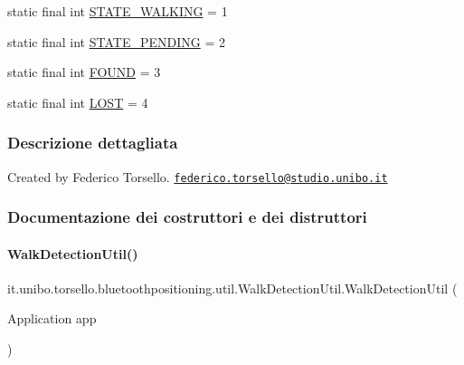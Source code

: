 \begin{DoxyCompactItemize}
\item 
static final int \hyperlink{classit_1_1unibo_1_1torsello_1_1bluetoothpositioning_1_1util_1_1WalkDetectionUtil_a7b7a1934c81b55c20ece9ba2d0bee4c8_a7b7a1934c81b55c20ece9ba2d0bee4c8}{S\+T\+A\+T\+E\+\_\+\+W\+A\+L\+K\+I\+NG} = 1
\item 
static final int \hyperlink{classit_1_1unibo_1_1torsello_1_1bluetoothpositioning_1_1util_1_1WalkDetectionUtil_afbb85c995ea51422b96e79d754c68b2e_afbb85c995ea51422b96e79d754c68b2e}{S\+T\+A\+T\+E\+\_\+\+P\+E\+N\+D\+I\+NG} = 2
\item 
static final int \hyperlink{classit_1_1unibo_1_1torsello_1_1bluetoothpositioning_1_1util_1_1WalkDetectionUtil_a92d2d4f6184e1513834edebcc1a4c25e_a92d2d4f6184e1513834edebcc1a4c25e}{F\+O\+U\+ND} = 3
\item 
static final int \hyperlink{classit_1_1unibo_1_1torsello_1_1bluetoothpositioning_1_1util_1_1WalkDetectionUtil_acf835a69ba13c0957f2f9e8829e40883_acf835a69ba13c0957f2f9e8829e40883}{L\+O\+ST} = 4
\end{DoxyCompactItemize}


\subsubsection{Descrizione dettagliata}
Created by Federico Torsello. \href{mailto:federico.torsello@studio.unibo.it}{\tt federico.\+torsello@studio.\+unibo.\+it} 

\subsubsection{Documentazione dei costruttori e dei distruttori}
\hypertarget{classit_1_1unibo_1_1torsello_1_1bluetoothpositioning_1_1util_1_1WalkDetectionUtil_a8303363468683e172b5a7132c3ebfb99_a8303363468683e172b5a7132c3ebfb99}{}\label{classit_1_1unibo_1_1torsello_1_1bluetoothpositioning_1_1util_1_1WalkDetectionUtil_a8303363468683e172b5a7132c3ebfb99_a8303363468683e172b5a7132c3ebfb99} 
\paragraph{\texorpdfstring{Walk\+Detection\+Util()}{WalkDetectionUtil()}}
{\footnotesize\ttfamily it.\+unibo.\+torsello.\+bluetoothpositioning.\+util.\+Walk\+Detection\+Util.\+Walk\+Detection\+Util (\begin{DoxyParamCaption}\item[{Application}]{app }\end{DoxyParamCaption})}


